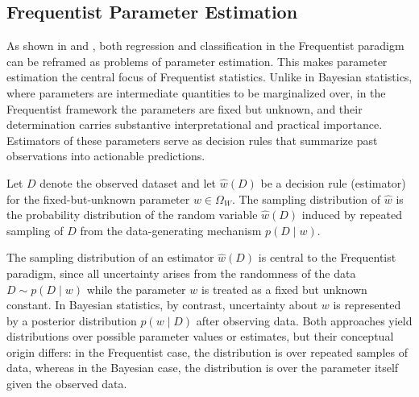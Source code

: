\subsection{Frequentist Parameter Estimation}
\label{chp:frequentist_parameter_estimation}
As shown in  and , both regression and classification in the Frequentist paradigm can be reframed as problems of parameter estimation. This makes parameter estimation the central focus of Frequentist statistics. Unlike in Bayesian statistics, where parameters are intermediate quantities to be marginalized over, in the Frequentist framework the parameters are fixed but unknown, and their determination carries substantive interpretational and practical importance. Estimators of these parameters serve as decision rules that summarize past observations into actionable predictions.

\begin{definition}
	Let $D$ denote the observed dataset and let $\hat{w}(D)$ be a decision rule (estimator) for the fixed-but-unknown parameter $w\in\Omega_W$. The sampling distribution of $\hat{w}$ is the probability distribution of the random variable $\hat{w}(D)$ induced by repeated sampling of $D$ from the data-generating mechanism $p(D \mid w)$.	
\end{definition}

\begin{remark}
	The sampling distribution of an estimator $\hat{w}(D)$ is central to the Frequentist paradigm, since all uncertainty arises from the randomness of the data $D \sim p(D \mid w)$ while the parameter $w$ is treated as a fixed but unknown constant. In Bayesian statistics, by contrast, uncertainty about $w$ is represented by a posterior distribution $p(w \mid D)$ after observing data. Both approaches yield distributions over possible parameter values or estimates, but their conceptual origin differs: in the Frequentist case, the distribution is over repeated samples of data, whereas in the Bayesian case, the distribution is over the parameter itself given the observed data.
\end{remark}

